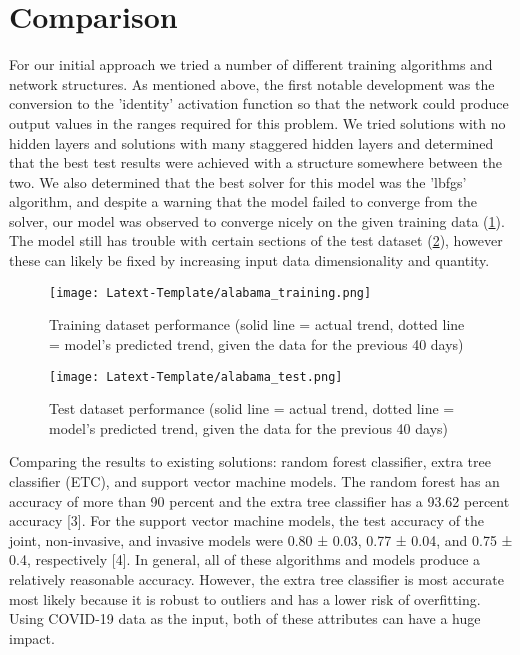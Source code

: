 \documentclass[conference]{IEEEtran}
\begin{document}
\section{Comparison}
For our initial approach we tried a number of different training algorithms and network structures. As mentioned above, the first notable development was the conversion to the 'identity' activation function so that the network could produce output values in the ranges required for this problem. We tried solutions with no hidden layers and solutions with many staggered hidden layers and determined that the best test results were achieved with a structure somewhere between the two. We also determined that the best solver for this model was the 'lbfgs' algorithm, and despite a warning that the model failed to converge from the solver, our model was observed to converge nicely on the given training data (\ref{fig:training_accuracy}). The model still has trouble with certain sections of the test dataset (\ref{fig:test_accuracy}), however these can likely be fixed by increasing input data dimensionality and quantity.

\begin{figure}
    \centering
    \texttt{[image: Latext-Template/alabama\_training.png]}
    \caption{Training dataset performance (solid line = actual trend, dotted line = model's predicted trend, given the data for the previous 40 days)}
    \label{fig:training_accuracy}
\end{figure}

\begin{figure}
    \centering
    \texttt{[image: Latext-Template/alabama\_test.png]}
    \caption{Test dataset performance (solid line = actual trend, dotted line = model's predicted trend, given the data for the previous 40 days)}
    \label{fig:test_accuracy}
\end{figure}

Comparing the results to existing solutions: random forest classifier, extra tree classifier (ETC), and support vector machine models. The random forest has an accuracy of more than 90 percent and the extra tree classifier has a 93.62 percent accuracy [3]. For the support vector machine models, the test accuracy of the joint, non-invasive, and invasive models were 0.80 ± 0.03, 0.77 ± 0.04, and 0.75 ± 0.4, respectively [4]. In general, all of these algorithms and models produce a relatively reasonable accuracy. However, the extra tree classifier is most accurate most likely because it is robust to outliers and has a lower risk of overfitting. Using COVID-19 data as the input, both of these attributes can have a huge impact.
\end{document}
